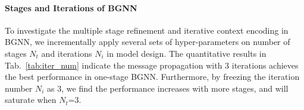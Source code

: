 \vspace{-4mm}
\paragraph{Stages and Iterations of BGNN}
To investigate the multiple stage refinement and iterative context encoding in BGNN, we incrementally apply several sets of hyper-parameters on number of stages $N_t$ and iterations $N_i$ in model design.
The quantitative results in Tab.~\ref{tab:iter_num} indicate the message propagation with 3 iterations achieves the best performance in one-stage BGNN.
Furthermore, by freezing the iteration number $N_i$ as 3, we find the performance increases with more stages, and will saturate when $N_t$=3.






